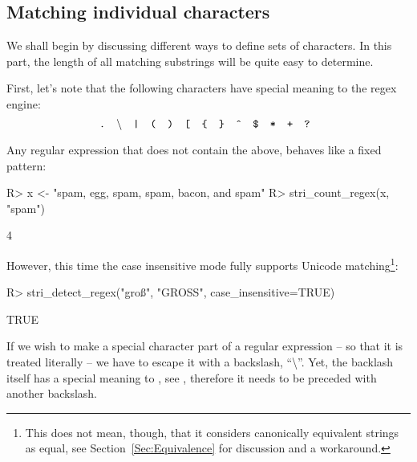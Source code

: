\documentclass[nojss]{jss}
\begin{document}
\subsection{Matching individual characters}\label{Sec:RegexIndividualChars}

We shall begin by discussing different ways to define sets of characters.
In this part, the length of all matching substrings will be quite
easy to determine.

First, let's note that the following characters have special
meaning to the regex engine:
\[
\text{
   \texttt{.}\quad
   \textbackslash{}\quad
   \texttt{|}\quad
   \texttt{(}\quad
   \texttt{)}\quad
   \texttt{[}\quad
   \texttt{\{}\quad
   \texttt{\}}\quad
   \texttt{\^{}}\quad
   \texttt{\$}\quad
   \texttt{*}\quad
   \texttt{+}\quad
   \texttt{?}\quad
}
\]

Any regular expression that does not contain the above,
behaves like a fixed pattern:

\begin{Schunk}
\begin{Sinput}
R> x <- "spam, egg, spam, spam, bacon, and spam"
R> stri_count_regex(x, "spam")
\end{Sinput}
\begin{Soutput}
[1] 4
\end{Soutput}
\end{Schunk}

However, this time the case insensitive mode fully
supports Unicode matching\footnote{%
This does not mean, though, that it considers canonically equivalent strings as equal,
see Section~\ref{Sec:Equivalence} for discussion and a workaround.}:

\begin{Schunk}
\begin{Sinput}
R> stri_detect_regex("groß", "GROSS", case_insensitive=TRUE)
\end{Sinput}
\begin{Soutput}
[1] TRUE
\end{Soutput}
\end{Schunk}

If we wish to make a special character part of a regular expression --
so that it is treated literally -- we have to escape it with  a backslash, ``\textbackslash''. Yet, the backlash itself
has a special meaning to , see ,
therefore it needs to be preceded with another backslash.
\end{document}
